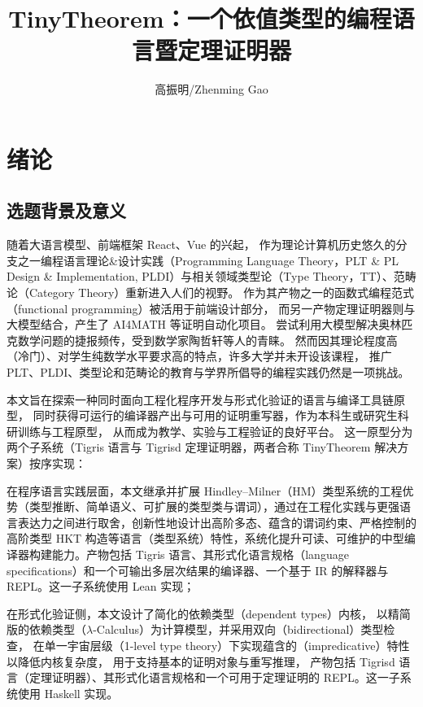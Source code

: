 \documentclass[a4paper, 11pt]{article}
\title{TinyTheorem：一个依值类型的编程语言暨定理证明器}
\author{高振明/Zhenming Gao}
\theoremstyle{remark}\newtheorem*{remark}{Remark}
\theoremstyle{definition}\newtheorem*{definition}{Definition}
\begin{document}
\maketitle

\tableofcontents
\pagebreak

\section{绪论}
\subsection{选题背景及意义}
随着大语言模型、前端框架 React、Vue 的兴起，
作为理论计算机历史悠久的分支之一编程语言理论\&设计实践（Programming Language Theory，PLT \& PL Design \& Implementation, PLDI）与相关领域类型论（Type Theory，TT）、范畴论（Category Theory）重新进入人们的视野。
作为其产物之一的函数式编程范式（functional programming）被活用于前端设计部分，
而另一产物定理证明器则与大模型结合，产生了 AI4MATH 等证明自动化项目。
尝试利用大模型解决奥林匹克数学问题的捷报频传，受到数学家陶哲轩等人的青睐。
然而因其理论程度高（冷门）、对学生纯数学水平要求高的特点，许多大学并未开设该课程，
推广 PLT、PLDI、类型论和范畴论的教育与学界所倡导的编程实践仍然是一项挑战。

本文旨在探索一种同时面向工程化程序开发与形式化验证的语言与编译工具链原型，
同时获得可运行的编译器产出与可用的证明重写器，作为本科生或研究生科研训练与工程原型，
从而成为教学、实验与工程验证的良好平台。
这一原型分为两个子系统（Tigris 语言与 Tigrisd 定理证明器，两者合称 TinyTheorem 解决方案）按序实现：

在程序语言实践层面，本文继承并扩展 Hindley–Milner（HM）类型系统的工程优势（类型推断、简单语义、可扩展的类型类与谓词），通过在工程化实践与更强语言表达力之间进行取舍，创新性地设计出高阶多态、蕴含的谓词约束、严格控制的高阶类型 HKT 构造等语言（类型系统）特性，系统化提升可读、可维护的中型编译器构建能力。产物包括 Tigris 语言、其形式化语言规格（language specifications）和一个可输出多层次结果的编译器、一个基于 IR 的解释器与 REPL。这一子系统使用 Lean 实现；

在形式化验证侧，本文设计了简化的依赖类型（dependent types）内核，
以精简版的依赖类型\lambdacalc（$\lambda$-Calculus）为计算模型，并采用双向（bidirectional）类型检查，
在单一宇宙层级（1-level type theory）下实现蕴含的（impredicative）特性以降低内核复杂度，
用于支持基本的证明对象与重写推理，
产物包括 Tigrisd 语言（定理证明器）、其形式化语言规格和一个可用于定理证明的 REPL。这一子系统使用 Haskell 实现。
\end{document}
